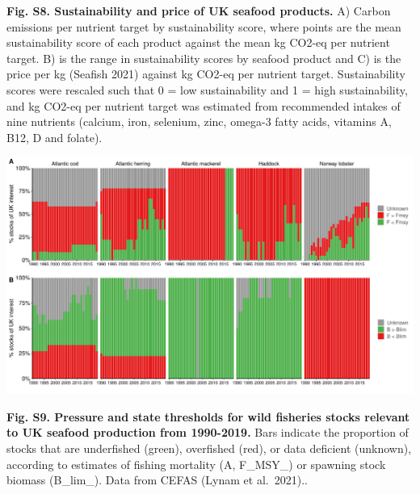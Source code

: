 \documentclass[
]{article}
\begin{document}
\textbf{Fig. S8. Sustainability and price of UK seafood products.} A)
Carbon emissions per nutrient target by sustainability score, where
points are the mean sustainability score of each product against the
mean kg CO2-eq per nutrient target. B) is the range in sustainability
scores by seafood product and C) is the price per kg (Seafish 2021)
against kg CO2-eq per nutrient target. Sustainability scores were
rescaled such that 0 = low sustainability and 1 = high sustainability,
and kg CO2-eq per nutrient target was estimated from recommended intakes
of nine nutrients (calcium, iron, selenium, zinc, omega-3 fatty acids,
vitamins A, B12, D and folate).

\newpage

\begin{center}\includegraphics[height=0.8\textheight]{fig/final/FigureSX_stock_status} \end{center}

\textbf{Fig. S9. Pressure and state thresholds for wild fisheries stocks
relevant to UK seafood production from 1990-2019.} Bars indicate the
proportion of stocks that are underfished (green), overfished (red), or
data deficient (unknown), according to estimates of fishing mortality
(A, F\_MSY\_) or spawning stock biomass (B\_lim\_). Data from CEFAS
(Lynam et al.~2021)..
\end{document}
